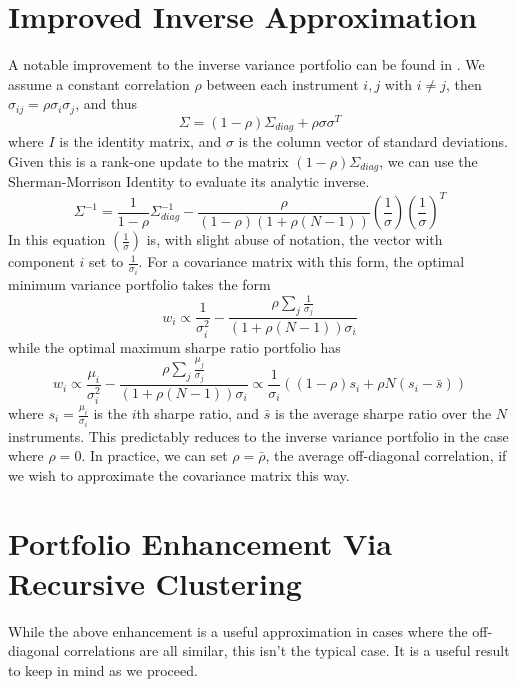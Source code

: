 \documentclass[10pt,twoside,titlepage]{article}   %
\begin{document}
\section{Improved Inverse Approximation}\label{sec-approx}
A notable improvement to the inverse variance portfolio can be found in \cite{LopezAndLewis}. 
We assume a constant correlation $\rho$ between each instrument $i, j$ with $i \neq j$, then $\sigma_{ij}=\rho \sigma_i \sigma_j$, and thus
\begin{equation*}
\Sigma = (1 - \rho) \Sigma_{diag} + \rho \sigma \sigma^T
\end{equation*}
where $I$ is the identity matrix, and $\sigma$ is the column vector of standard deviations. 
Given this is a rank-one update to the matrix $(1 - \rho) \Sigma_{diag}$, we can use the Sherman-Morrison Identity to evaluate its analytic inverse.
\begin{equation*}
\Sigma^{-1} = \frac{1}{1 - \rho} \Sigma_{diag}^{-1} - \frac{ \rho }{ (1-\rho) (1 + \rho (N-1) ) } \left( \frac{1}{\sigma} \right) \left( \frac{1}{\sigma} \right)^T
\end{equation*}
In this equation $\left( \frac{1}{\sigma} \right)$ is, with slight abuse of notation, 
the vector with component $i$ set to $\frac{1}{\sigma_i}$. 
For a covariance matrix with this form, the optimal minimum variance portfolio takes the form
\begin{equation*}
w_i \propto \frac{1}{\sigma_i^2} - \frac{ \rho \sum_j \frac{1}{\sigma_j} }{ ( 1 + \rho (N-1) )\sigma_i  }
\end{equation*}
while the optimal maximum sharpe ratio portfolio has
\begin{equation*}
w_i \propto \frac{\mu_i}{\sigma_i^2} - \frac{ \rho \sum_j \frac{\mu_j}{\sigma_j} }{ ( 1 + \rho (N-1) )\sigma_i  } \propto \frac{1}{\sigma_i} \left( (1-\rho) s_i + \rho N ( s_i - \bar{s} ) \right)
\end{equation*}
where $s_i = \frac{\mu_i}{\sigma_i}$ is the $i$th sharpe ratio, and $\bar{s}$ is the average sharpe ratio over the $N$ instruments. 
This predictably reduces to the inverse variance portfolio in the case where $\rho=0$. 
In practice, we can set $\rho = \bar{\rho}$, the average off-diagonal correlation, if we wish to approximate the covariance matrix this way.

\section{Portfolio Enhancement Via Recursive Clustering}\label{sec-RCRP}
While the above enhancement is a useful approximation in cases where the off-diagonal correlations are all similar, this isn’t the typical case.
It is a useful result to keep in mind as we proceed.
\end{document}
